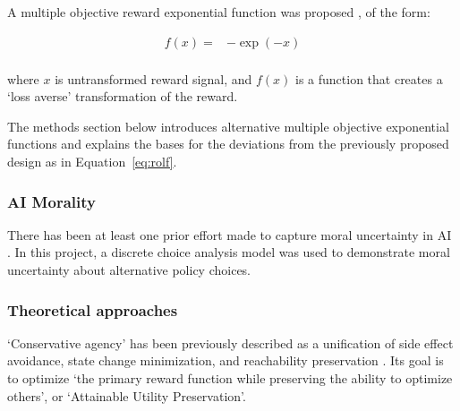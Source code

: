 A multiple objective reward exponential function was proposed \cite{rolf_need_2020}, of the form:

\begin{align}\label{eq:rolf}
f(x)= &  -\exp(-x) \\ \nonumber
\end{align}

 where $x$ is untransformed reward signal, and $f(x)$ is a function that creates a `loss averse' transformation of the reward.

The methods section below introduces alternative multiple objective exponential functions and explains the bases for the deviations from the previously proposed \cite{rolf_need_2020} design as in Equation~\ref{eq:rolf}.

\subsubsection{AI Morality}

There has been at least one prior effort made to capture moral uncertainty in AI \cite{martinho_empirical_2020}. In this project, a discrete choice analysis model was used to demonstrate moral uncertainty about alternative policy choices.



\subsubsection{Theoretical approaches}


`Conservative agency' has been previously described as a unification of side effect avoidance, state change minimization, and reachability preservation \cite{armstrong_low_2017, turner_conservative_2020}. Its goal is to optimize `the primary reward function while preserving the ability to optimize others', or `Attainable Utility Preservation'.

